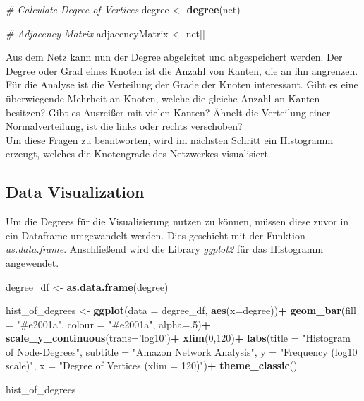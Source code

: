\documentclass[
  12 pt,
]{article}
\newenvironment{Shaded}{\begin{snugshade}}{\end{snugshade}}
\newcommand{\CommentTok}[1]{\textcolor[rgb]{0.56,0.35,0.01}{\textit{#1}}}
\newcommand{\DataTypeTok}[1]{\textcolor[rgb]{0.13,0.29,0.53}{#1}}
\newcommand{\DecValTok}[1]{\textcolor[rgb]{0.00,0.00,0.81}{#1}}
\newcommand{\KeywordTok}[1]{\textcolor[rgb]{0.13,0.29,0.53}{\textbf{#1}}}
\newcommand{\NormalTok}[1]{#1}
\newcommand{\OperatorTok}[1]{\textcolor[rgb]{0.81,0.36,0.00}{\textbf{#1}}}
\newcommand{\StringTok}[1]{\textcolor[rgb]{0.31,0.60,0.02}{#1}}
\begin{document}
\begin{Shaded}
\begin{Highlighting}[]
\CommentTok{# Calculate Degree of Vertices}
\NormalTok{degree <-}\StringTok{ }\KeywordTok{degree}\NormalTok{(net)}

\CommentTok{# Adjacency Matrix}
\NormalTok{adjacencyMatrix <-}\StringTok{ }\NormalTok{net[]}
\end{Highlighting}
\end{Shaded}

Aus dem Netz kann nun der Degree abgeleitet und abgespeichert werden.
Der Degree oder Grad eines Knoten ist die Anzahl von Kanten, die an ihn
angrenzen. Für die Analyse ist die Verteilung der Grade der Knoten
interessant. Gibt es eine überwiegende Mehrheit an Knoten, welche die
gleiche Anzahl an Kanten besitzen? Gibt es Ausreißer mit vielen Kanten?
Ähnelt die Verteilung einer Normalverteilung, ist die links oder rechts
verschoben?\\
Um diese Fragen zu beantworten, wird im nächsten Schritt ein Histogramm
erzeugt, welches die Knotengrade des Netzwerkes visualisiert.\\

\hypertarget{data-visualization}{%
\subsection{Data Visualization}\label{data-visualization}}

Um die Degrees für die Visualisierung nutzen zu können, müssen diese
zuvor in ein Dataframe umgewandelt werden. Dies geschieht mit der
Funktion \textit{as.data.frame}. Anschließend wird die Library
\textit{ggplot2} für das Histogramm angewendet.

\begin{Shaded}
\begin{Highlighting}[]
\NormalTok{degree_df <-}\StringTok{ }\KeywordTok{as.data.frame}\NormalTok{(degree)}


\NormalTok{hist_of_degrees <-}\StringTok{ }\KeywordTok{ggplot}\NormalTok{(}\DataTypeTok{data =}\NormalTok{ degree_df, }\KeywordTok{aes}\NormalTok{(}\DataTypeTok{x=}\NormalTok{degree))}\OperatorTok{+}
\StringTok{  }\KeywordTok{geom_bar}\NormalTok{(}\DataTypeTok{fill =} \StringTok{"#e2001a"}\NormalTok{, }\DataTypeTok{colour =} \StringTok{"#e2001a"}\NormalTok{, }\DataTypeTok{alpha=}\NormalTok{.}\DecValTok{5}\NormalTok{)}\OperatorTok{+}
\StringTok{  }\KeywordTok{scale_y_continuous}\NormalTok{(}\DataTypeTok{trans=}\StringTok{'log10'}\NormalTok{)}\OperatorTok{+}
\StringTok{  }\KeywordTok{xlim}\NormalTok{(}\DecValTok{0}\NormalTok{,}\DecValTok{120}\NormalTok{)}\OperatorTok{+}
\StringTok{  }\KeywordTok{labs}\NormalTok{(}\DataTypeTok{title =} \StringTok{"Histogram of Node-Degrees"}\NormalTok{, }
       \DataTypeTok{subtitle =} \StringTok{"Amazon Network Analysis"}\NormalTok{, }
       \DataTypeTok{y =} \StringTok{"Frequency (log10 scale)"}\NormalTok{, }
       \DataTypeTok{x =} \StringTok{"Degree of Vertices (xlim = 120)"}\NormalTok{)}\OperatorTok{+}
\StringTok{  }\KeywordTok{theme_classic}\NormalTok{()}

\NormalTok{hist_of_degrees}
\end{Highlighting}
\end{Shaded}
\end{document}
